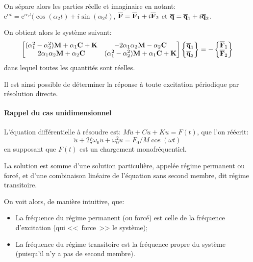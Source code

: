 \medskip
On sépare alors les parties réelle et imaginaire en notant:
$\mathrm{e}^{\alpha t}=\mathrm{e}^{\alpha_1 t}(\cos(\alpha_2 t)+i\sin(\alpha_2 t)$, $\VV{\overline{F}}=\VV{\overline{F}}_1
+i\VV{\overline{F}}_2$ et $\VV{\overline{q}}=\VV{\overline{q}}_1+i\VV{\overline{q}}_2$.

On obtient alors le système suivant:
\begin{equation}
\MM*{(\alpha_1^2-\alpha_2^2)\MM{M}+\alpha_1\MM{C}+\MM{K} & -2\alpha_1\alpha_2\MM{M}-\alpha_2\MM{C}\\
2\alpha_1\alpha_2\MM{M}+\alpha_2\MM{C} & (\alpha_1^2-\alpha_2^2)\MM{M}+\alpha_1\MM{C}+\MM{K}}
\VV*{\VV{\overline{q}}_1\\ \VV{\overline{q}}_2}
=
-\VV*{\VV{\overline{F}}_1\\ \VV{\overline{F}}_2}
\end{equation}
dans lequel toutes les quantités sont réelles. 

Il est ainsi possible de déterminer la réponse à toute excitation périodique par résolution directe.

\medskip
{}

\medskip
{}
\paragraph{Rappel du cas unidimensionnel}
L'équation différentielle à résoudre est: $M\ddot{u}+C\dot{u}+Ku=F(t)$, que l'on
réécrit: \begin{equation} \ddot{u}+2\xi\omega_0\dot{u}+\omega^2_0 u=F_0/M \cos(\omega t)\end{equation}
en supposant que $F(t)$ est un chargement monofréquentiel. 

La solution est somme d'une solution particulière, appelée régime permanent ou forcé, et d'une
combinaison linéaire de l'équation sans second membre, dit régime transitoire.

On voit alors, de manière intuitive, que:
\begin{itemize}%
   \item La fréquence du régime permanent (ou forcé) est celle de la fréquence d'excitation (qui <<~force~>> le système);
   \item La fréquence du régime transitoire est la fréquence propre du système (puisqu'il n'y a pas de second membre).
\end{itemize}


